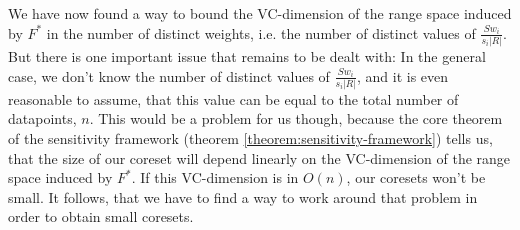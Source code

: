 We have now found a way to bound the VC-dimension of the range space
induced by $F^\ast$ in the number of distinct weights, i.e.
the number of distinct values of $\frac{S w_i}{s_i |R|}$.
But there is one important issue that remains to be dealt with:
In the general case, we don't know the number of distinct
values of $\frac{S w_i}{s_i |R|}$, and it is even reasonable to
assume, that this value can be equal
to the total number of datapoints, $n$.
This would be a problem for us though, because the core theorem
of the sensitivity framework
(theorem \ref{theorem:sensitivity-framework}) tells us,
that the size of our
coreset will depend linearly on the VC-dimension of the range
space induced by $F^\ast$. If this VC-dimension is in $O(n)$,
our coresets won't be small. It follows, that we have to find
a way to work around that problem in order to obtain small coresets.

